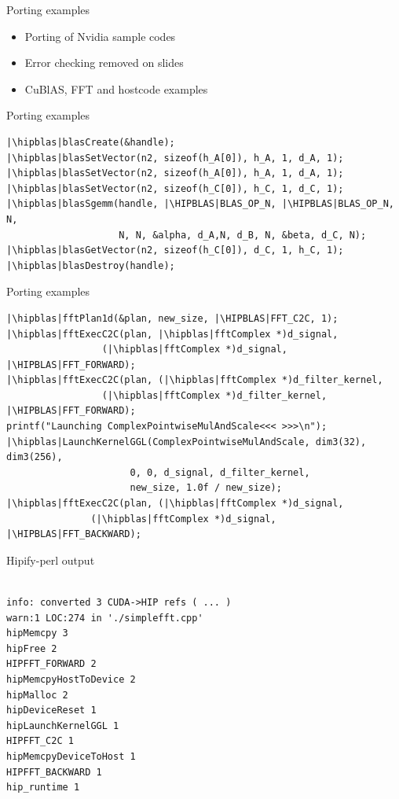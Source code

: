 \documentclass[aspectratio=169]{beamer}
\newcommand{\hipblas}{\sout{\color{red}{cu}}\textbf{\color{green}{hip}}}
\newcommand{\HIPBLAS}{\sout{\color{red}{CU}}\textbf{\color{green}{HIP}}}
\begin{document}
\begin{frame}[fragile]{Porting examples}
\begin{itemize}
    \item Porting of Nvidia sample codes
    \item Error checking removed on slides
    \item CuBlAS, FFT and hostcode examples
\end{itemize}
\end{frame}


\begin{frame}[fragile]{Porting examples}
\begin{verbatim}
|\hipblas|blasCreate(&handle);
|\hipblas|blasSetVector(n2, sizeof(h_A[0]), h_A, 1, d_A, 1);
|\hipblas|blasSetVector(n2, sizeof(h_A[0]), h_A, 1, d_A, 1);
|\hipblas|blasSetVector(n2, sizeof(h_C[0]), h_C, 1, d_C, 1);
|\hipblas|blasSgemm(handle, |\HIPBLAS|BLAS_OP_N, |\HIPBLAS|BLAS_OP_N, N, 
                    N, N, &alpha, d_A,N, d_B, N, &beta, d_C, N);
|\hipblas|blasGetVector(n2, sizeof(h_C[0]), d_C, 1, h_C, 1);
|\hipblas|blasDestroy(handle);
\end{verbatim}
\end{frame}

\begin{frame}[fragile]{Porting examples}

\begin{verbatim}
|\hipblas|fftPlan1d(&plan, new_size, |\HIPBLAS|FFT_C2C, 1);
|\hipblas|fftExecC2C(plan, |\hipblas|fftComplex *)d_signal,
                 (|\hipblas|fftComplex *)d_signal, |\HIPBLAS|FFT_FORWARD);
|\hipblas|fftExecC2C(plan, (|\hipblas|fftComplex *)d_filter_kernel,
                 (|\hipblas|fftComplex *)d_filter_kernel, |\HIPBLAS|FFT_FORWARD);
printf("Launching ComplexPointwiseMulAndScale<<< >>>\n");
|\hipblas|LaunchKernelGGL(ComplexPointwiseMulAndScale, dim3(32), dim3(256),
                      0, 0, d_signal, d_filter_kernel,
                      new_size, 1.0f / new_size);
|\hipblas|fftExecC2C(plan, (|\hipblas|fftComplex *)d_signal,
               (|\hipblas|fftComplex *)d_signal, |\HIPBLAS|FFT_BACKWARD);
\end{verbatim}
\end{frame}

\begin{frame}[fragile]{Hipify-perl output}

\begin{verbatim}
    
info: converted 3 CUDA->HIP refs ( ... )
warn:1 LOC:274 in './simplefft.cpp'
hipMemcpy 3
hipFree 2
HIPFFT_FORWARD 2
hipMemcpyHostToDevice 2
hipMalloc 2
hipDeviceReset 1
hipLaunchKernelGGL 1
HIPFFT_C2C 1
hipMemcpyDeviceToHost 1
HIPFFT_BACKWARD 1
hip_runtime 1
\end{verbatim}
\end{frame}
\end{document}

